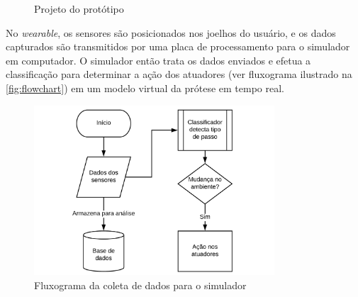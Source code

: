 \begin{figure}[ht]
    \centering
    \caption{Projeto do protótipo}
    \label{fig:big_picture_simulation}
        \hspace{0.5cm}
\end{figure}

No \textit{wearable}, os sensores são posicionados nos joelhos do usuário, e os dados capturados são transmitidos por uma placa de processamento para o simulador em computador. 
O simulador então trata os dados enviados e efetua a classificação para determinar a ação dos atuadores (ver fluxograma ilustrado na \autoref{fig:flowchart}) em um modelo virtual da prótese em tempo real.

\begin{figure}[ht]
	\caption{\label{fig:flowchart}Fluxograma da coleta de dados para o simulador}
	\begin{center}
	    \includegraphics[width=0.8\textwidth]{resources/flowchart}
	\end{center}
\end{figure}


